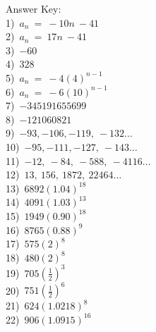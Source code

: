 \documentclass[12pt]{article}
\begin{document}
\begin{minipage}{\textwidth}
\hrulefill


\end{minipage}\vspace{1 in}Answer Key: \\1)~$a_n~=~-10n~-41$\\2)~$a_n~=~17n~-41$\\3)~$-60$\\4)~$328$\\5)~$a_n~=~-4(4)^{n-1}$\\6)~$a_n~=~-6(10)^{n-1}$\\7)~$-345191655699$\\8)~$-121060821$\\9)~$-93, -106, -119,~-132\ldots $\\10)~$-95, -111, -127,~-143\ldots $\\11)~$-12,~-84,~-588,~-4116\ldots $\\12)~$13,~156,~1872,~22464\ldots $\\13)~$6892(1.04)^{18}$\\14)~$4091(1.03)^{13}$\\15)~$1949(0.90)^{18}$\\16)~$8765(0.88)^{9}$\\17)~$575(2)^{8}$\\18)~$480(2)^{8}$\\19)~$705(\frac{1}{2})^{3}$\\20)~$751(\frac{1}{2})^{6}$\\21)~$624(1.0218)^{8}$\\22)~$906(1.0915)^{16}$\\
\end{document}
